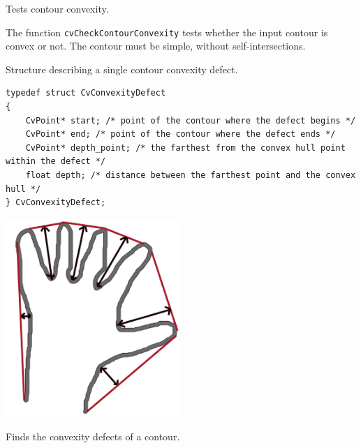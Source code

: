 \label{CheckContourConvexity}

Tests contour convexity.


\begin{description}
\end{description}

The function \texttt{cvCheckContourConvexity} tests whether the input contour is convex or not. The contour must be simple, without self-intersections.

\label{CvConvexityDefect}

Structure describing a single contour convexity defect.

\begin{lstlisting}
typedef struct CvConvexityDefect
{
    CvPoint* start; /* point of the contour where the defect begins */
    CvPoint* end; /* point of the contour where the defect ends */
    CvPoint* depth_point; /* the farthest from the convex hull point within the defect */
    float depth; /* distance between the farthest point and the convex hull */
} CvConvexityDefect;
\end{lstlisting}

\includegraphics[width=0.5\textwidth]{pics/defects.png}

\label{ConvexityDefects}

Finds the convexity defects of a contour.


